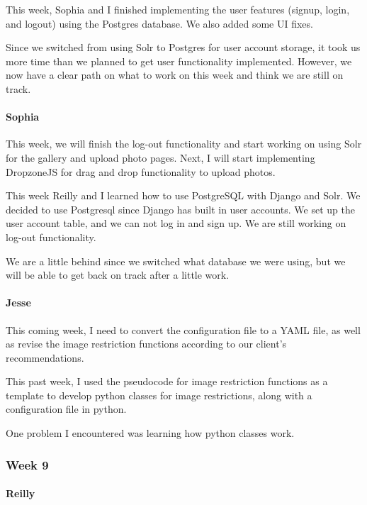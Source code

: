 \documentclass[onecolumn, draftclsnofoot,10pt, compsoc]{IEEEtran}
\begin{document}
\begin{flushleft}
 
This week, Sophia and I finished implementing the user features (signup, login, and logout) using the Postgres database. We also added some UI fixes.
 
 
Since we switched from using Solr to Postgres for user account storage, it took us more time than we planned to get user functionality implemented. However, we now have a clear path on what to work on this week and think we are still on track.
 
\paragraph{Sophia}
 
This week, we will finish the log-out functionality and start working on using Solr for the gallery and upload photo pages. Next, I will start implementing DropzoneJS for drag and drop functionality to upload photos.
 
 
This week Reilly and I learned how to use PostgreSQL with Django and Solr. We decided to use Postgresql since Django has built in user accounts. We set up the user account table, and we can not log in and sign up. We are still working on log-out functionality.
 
 
We are a little behind since we switched what database we were using, but we will be able to get back on track after a little work.
 
\paragraph{Jesse}
 
This coming week, I need to convert the configuration file to a YAML file, as well as revise the image restriction functions according to our client's recommendations.
 
 
This past week, I used the pseudocode for image restriction functions as a template to develop python classes for image restrictions, along with a configuration file in python.
 
 
One problem I encountered was learning how python classes work.
 
\subsubsection{Week 9}
\paragraph{Reilly}
 

\end{flushleft}
\end{document}
